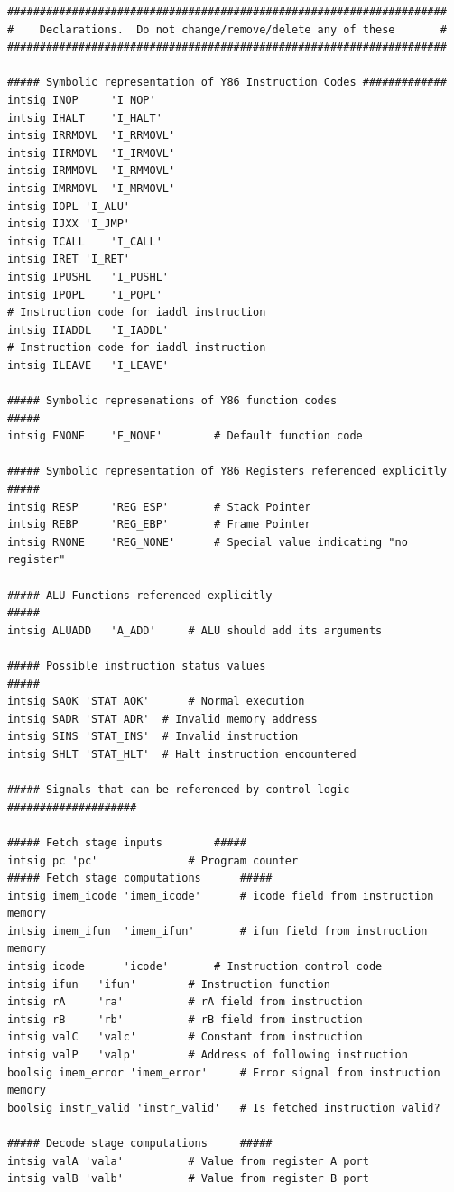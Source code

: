 \documentclass{article}
\begin{document}
\begin{lstlisting}[caption={}]
####################################################################
#    Declarations.  Do not change/remove/delete any of these       #
####################################################################

##### Symbolic representation of Y86 Instruction Codes #############
intsig INOP 	'I_NOP'
intsig IHALT	'I_HALT'
intsig IRRMOVL	'I_RRMOVL'
intsig IIRMOVL	'I_IRMOVL'
intsig IRMMOVL	'I_RMMOVL'
intsig IMRMOVL	'I_MRMOVL'
intsig IOPL	'I_ALU'
intsig IJXX	'I_JMP'
intsig ICALL	'I_CALL'
intsig IRET	'I_RET'
intsig IPUSHL	'I_PUSHL'
intsig IPOPL	'I_POPL'
# Instruction code for iaddl instruction
intsig IIADDL	'I_IADDL'
# Instruction code for iaddl instruction
intsig ILEAVE	'I_LEAVE'

##### Symbolic represenations of Y86 function codes                  #####
intsig FNONE    'F_NONE'        # Default function code

##### Symbolic representation of Y86 Registers referenced explicitly #####
intsig RESP     'REG_ESP'    	# Stack Pointer
intsig REBP     'REG_EBP'    	# Frame Pointer
intsig RNONE    'REG_NONE'   	# Special value indicating "no register"

##### ALU Functions referenced explicitly                            #####
intsig ALUADD	'A_ADD'		# ALU should add its arguments

##### Possible instruction status values                             #####
intsig SAOK	'STAT_AOK'		# Normal execution
intsig SADR	'STAT_ADR'	# Invalid memory address
intsig SINS	'STAT_INS'	# Invalid instruction
intsig SHLT	'STAT_HLT'	# Halt instruction encountered

##### Signals that can be referenced by control logic ####################

##### Fetch stage inputs		#####
intsig pc 'pc'				# Program counter
##### Fetch stage computations		#####
intsig imem_icode 'imem_icode'		# icode field from instruction memory
intsig imem_ifun  'imem_ifun' 		# ifun field from instruction memory
intsig icode	  'icode'		# Instruction control code
intsig ifun	  'ifun'		# Instruction function
intsig rA	  'ra'			# rA field from instruction
intsig rB	  'rb'			# rB field from instruction
intsig valC	  'valc'		# Constant from instruction
intsig valP	  'valp'		# Address of following instruction
boolsig imem_error 'imem_error'		# Error signal from instruction memory
boolsig instr_valid 'instr_valid'	# Is fetched instruction valid?

##### Decode stage computations		#####
intsig valA	'vala'			# Value from register A port
intsig valB	'valb'			# Value from register B port


\end{lstlisting}
\end{document}
